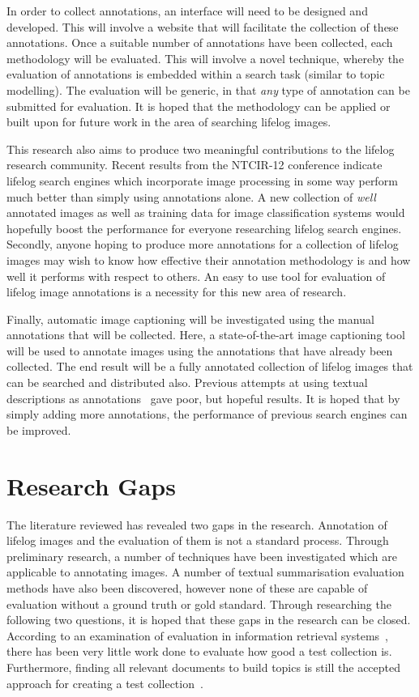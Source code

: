 In order to collect annotations, an interface will need to be designed and developed. This will involve a website that will facilitate the collection of these annotations. Once a suitable number of annotations have been collected, each methodology will be evaluated. This will involve a novel technique, whereby the evaluation of annotations is embedded within a search task (similar to topic modelling). The evaluation will be generic, in that \textit{any} type of annotation can be submitted for evaluation. It is hoped that the methodology can be applied or built upon for future work in the area of searching lifelog images.

This research also aims to produce two meaningful contributions to the lifelog research community. Recent results from the NTCIR-12 conference indicate lifelog search engines which incorporate image processing in some way perform much better than simply using annotations alone. A new collection of \textit{well} annotated images as well as training data for image classification systems would hopefully boost the performance for everyone researching lifelog search engines. Secondly, anyone hoping to produce more annotations for a collection of lifelog images may wish to know how effective their annotation methodology is and how well it performs with respect to others. An easy to use tool for evaluation of lifelog image annotations is a necessity for this new area of research.

Finally, automatic image captioning will be investigated using the manual annotations that will be collected. Here, a state-of-the-art image captioning tool will be used to annotate images using the annotations that have already been collected. The end result will be a fully annotated collection of lifelog images that can be searched and distributed also. Previous attempts at using textual descriptions as annotations~\cite{scells2016qut} gave poor, but hopeful results. It is hoped that by simply adding more annotations, the performance of previous search engines can be improved.

\section{Research Gaps}

The literature reviewed has revealed two gaps in the research. Annotation of lifelog images and the evaluation of them is not a standard process. Through preliminary research, a number of techniques have been investigated which are applicable to annotating images. A number of textual summarisation evaluation methods have also been discovered, however none of these are capable of evaluation without a ground truth or gold standard. Through researching the following two questions, it is hoped that these gaps in the research can be closed. According to an examination of evaluation in information retrieval systems~\cite[p. 24]{sanderson2010test}, there has been very little work done to evaluate how good a test collection is. Furthermore, finding all relevant documents to build topics is still the accepted approach for creating a test collection~\cite{cooper1973selecting}.

